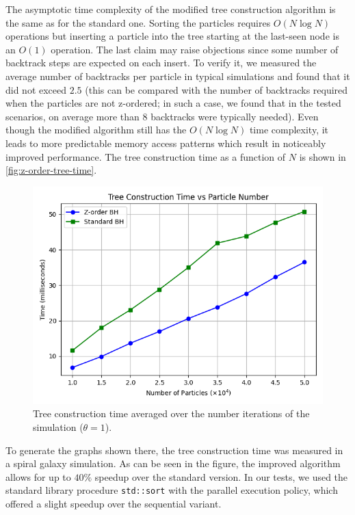 The asymptotic time complexity of the modified tree construction algorithm is the same as for the standard one.
Sorting the particles requires $O(N\log N)$ operations but inserting a particle into the tree starting at the last-seen node is an $O(1)$ operation.
The last claim may raise objections since some number of backtrack steps are expected on each insert.
To verify it, we measured the average number of backtracks per particle in typical simulations and found that it did not exceed $2.5$ (this can be compared with the number of backtracks required when the particles are not z-ordered; in such a case, we found that in the tested scenarios, on average more than 8 backtracks were typically needed).
Even though the modified algorithm still has the $O(N\log N)$ time complexity, it leads to more predictable memory access patterns which result in noticeably improved performance.
The tree construction time as a function of $N$ is shown in \autoref{fig:z-order-tree-time}.
\begin{figure}[htp]
    \centering
    \includegraphics[scale=0.5]{chapters/barnes-hut/img/tree_construction_time.png}
    \caption{Tree construction time averaged over the number iterations of the simulation ($\theta = 1$).}
    \label{fig:z-order-tree-time}
\end{figure}
To generate the graphs shown there, the tree construction time was measured in a spiral galaxy simulation.
As can be seen in the figure, the improved algorithm allows for up to $40\%$ speedup over the standard version.
In our tests, we used the standard library procedure \texttt{std::sort} with the parallel execution policy, which offered a slight speedup over the sequential variant.